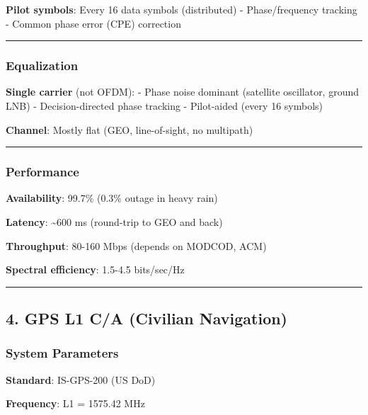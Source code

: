\textbf{Pilot symbols}: Every 16 data symbols (distributed) -
Phase/frequency tracking - Common phase error (CPE) correction

\begin{center}\rule{0.5\linewidth}{0.5pt}\end{center}

\subsubsection{Equalization}\label{equalization-1}

\textbf{Single carrier} (not OFDM): - Phase noise dominant (satellite
oscillator, ground LNB) - Decision-directed phase tracking - Pilot-aided
(every 16 symbols)

\textbf{Channel}: Mostly flat (GEO, line-of-sight, no multipath)

\begin{center}\rule{0.5\linewidth}{0.5pt}\end{center}

\subsubsection{Performance}\label{performance-2}

\textbf{Availability}: 99.7\% (0.3\% outage in heavy rain)

\textbf{Latency}: \textasciitilde600 ms (round-trip to GEO and back)

\textbf{Throughput}: 80-160 Mbps (depends on MODCOD, ACM)

\textbf{Spectral efficiency}: 1.5-4.5 bits/sec/Hz

\begin{center}\rule{0.5\linewidth}{0.5pt}\end{center}

\subsection{4. GPS L1 C/A (Civilian
Navigation)}\label{gps-l1-ca-civilian-navigation}

\subsubsection{System Parameters}\label{system-parameters-3}

\textbf{Standard}: IS-GPS-200 (US DoD)

\textbf{Frequency}: L1 = 1575.42 MHz

